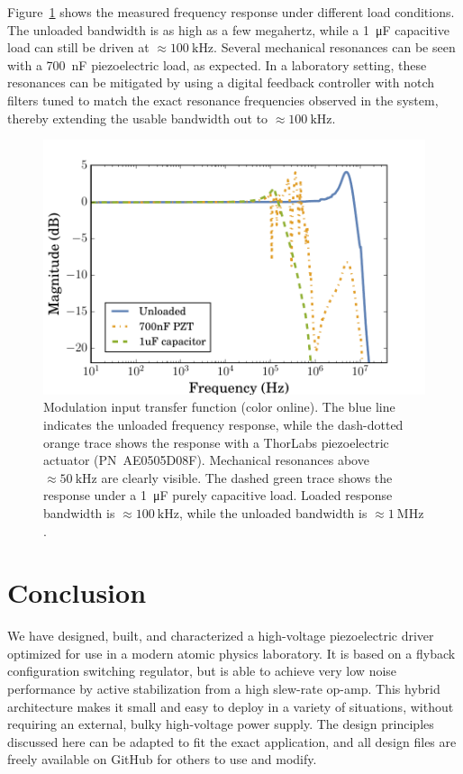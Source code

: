 \documentclass[aip,rsi,reprint]{revtex4-1} %
\begin{document}
Figure~\ref{Fig:TransferFunc} shows the measured frequency response under different load conditions. The unloaded bandwidth is as high as a few megahertz, while a \SI{1}{\micro\farad} capacitive load can still be driven at $\approx\SI{100}{\kilo\hertz}$. 
Several mechanical resonances can be seen with a \SI{700}{\nano\farad} piezoelectric load, as expected.
In a laboratory setting, these resonances can be mitigated by using a digital feedback controller with notch filters tuned to match the exact resonance frequencies observed in the system\cite{Ryou2016a}, thereby extending the usable bandwidth out to $\approx\SI{100}{\kilo\hertz}$.
\begin{figure}[t]
\includegraphics[width=\columnwidth]{fig/PiezoModulationTransfer.pdf}
\caption{Modulation input transfer function (color online). The blue line indicates the unloaded frequency response, while the dash-dotted orange trace shows the response with a ThorLabs piezoelectric actuator {(PN~AE0505D08F)}. Mechanical resonances above $\approx\SI{50}{\kilo\hertz}$ are clearly visible. The dashed green trace shows the response under a \SI{1}{\micro\farad} purely capacitive load. Loaded response bandwidth is $\approx\SI{100}{\kilo\hertz}$, while the unloaded bandwidth is $\approx\SI{1}{\mega\hertz}$.\label{Fig:TransferFunc}}
\end{figure}

\section{Conclusion}
\label{Sec:Conclusion}

We have designed, built, and characterized a high-voltage piezoelectric driver optimized for use in a modern atomic physics laboratory.
It is based on a flyback configuration switching regulator, but is able to achieve very low noise performance by active stabilization from a high slew-rate op-amp.
This hybrid architecture makes it small and easy to deploy in a variety of situations, without requiring an external, bulky high-voltage power supply.
The design principles discussed here can be adapted to fit the exact application, and all design files are freely available on GitHub for others to use and modify.
\end{document}
